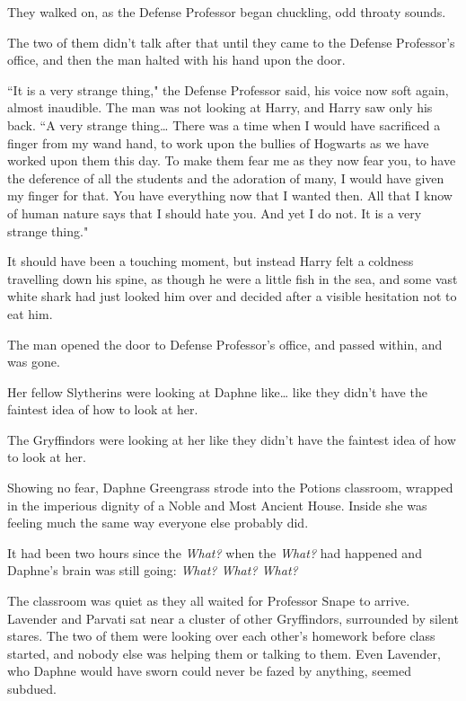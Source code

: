 They walked on, as the Defense Professor began chuckling, odd throaty sounds.

The two of them didn't talk after that until they came to the Defense Professor's office, and then the man halted with his hand upon the door.

``It is a very strange thing," the Defense Professor said, his voice now soft again, almost inaudible. The man was not looking at Harry, and Harry saw only his back. ``A very strange thing{\ldots} There was a time when I would have sacrificed a finger from my wand hand, to work upon the bullies of Hogwarts as we have worked upon them this day. To make them fear me as they now fear you, to have the deference of all the students and the adoration of many, I would have given my finger for that. You have everything now that I wanted then. All that I know of human nature says that I should hate you. And yet I do not. It is a very strange thing."

It should have been a touching moment, but instead Harry felt a coldness travelling down his spine, as though he were a little fish in the sea, and some vast white shark had just looked him over and decided after a visible hesitation not to eat him.

The man opened the door to Defense Professor's office, and passed within, and was gone.


Her fellow Slytherins were looking at Daphne like{\ldots} like they didn't have the faintest idea of how to look at her.

The Gryffindors were looking at her like they didn't have the faintest idea of how to look at her.

Showing no fear, Daphne Greengrass strode into the Potions classroom, wrapped in the imperious dignity of a Noble and Most Ancient House. Inside she was feeling much the same way everyone else probably did.

It had been two hours since the \emph{What?} when the \emph{What?} had happened and Daphne's brain was still going: \emph{What? What? What?}

The classroom was quiet as they all waited for Professor Snape to arrive. Lavender and Parvati sat near a cluster of other Gryffindors, surrounded by silent stares. The two of them were looking over each other's homework before class started, and nobody else was helping them or talking to them. Even Lavender, who Daphne would have sworn could never be fazed by anything, seemed subdued.

